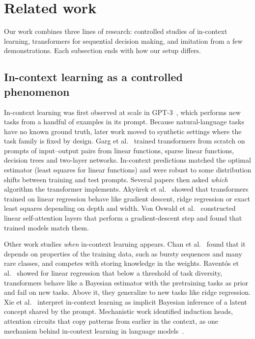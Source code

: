 \section{Related work}
\label{sec:related}

Our work combines three lines of research: controlled studies of in-context learning, transformers for sequential decision
making, and imitation from a few demonstrations. Each subsection ends with how our setup differs.

\subsection{In-context learning as a controlled phenomenon}
In-context learning was first observed at scale in GPT-3~\cite{brown2020language}, which performs new tasks from a handful of
examples in its prompt. Because natural-language tasks have no known ground truth, later work moved to synthetic settings where
the task family is fixed by design. Garg et al.~\cite{garg2022can} trained transformers from scratch on prompts of input--output
pairs from linear functions, sparse linear functions, decision trees and two-layer networks. In-context predictions matched the
optimal estimator (least squares for linear functions) and were robust to some distribution shifts between training and test
prompts. Several papers then asked \emph{which} algorithm the transformer implements. Aky{\"u}rek et al.~\cite{akyurek2023learning}
showed that transformers trained on linear regression behave like gradient descent, ridge regression or exact least squares
depending on depth and width. Von Oswald et al.~\cite{vonoswald2023transformers} constructed linear self-attention layers that
perform a gradient-descent step and found that trained models match them.

Other work studies \emph{when} in-context learning appears. Chan et al.~\cite{chan2022data} found that it depends on properties of
the training data, such as bursty sequences and many rare classes, and competes with storing knowledge in the weights. Raventós et
al.~\cite{raventos2023pretraining} showed for linear regression that below a threshold of task diversity, transformers behave like a
Bayesian estimator with the pretraining tasks as prior and fail on new tasks. Above it, they generalize to new tasks like ridge
regression. Xie et al.~\cite{xie2022explanation} interpret in-context learning as implicit Bayesian inference of a latent concept
shared by the prompt. Mechanistic work identified induction heads, attention circuits that copy patterns from earlier in the
context, as one mechanism behind in-context learning in language models~\cite{olsson2022context}.

